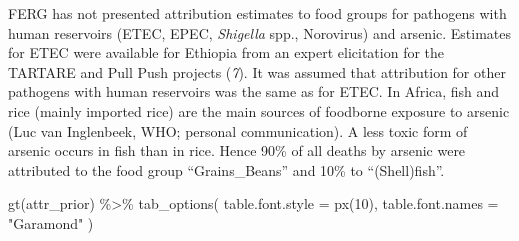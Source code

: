 \documentclass[
  letterpaper,
  DIV=11,
  numbers=noendperiod]{scrartcl}
\newenvironment{Shaded}{\begin{snugshade}}{\end{snugshade}}
\newcommand{\AttributeTok}[1]{\textcolor[rgb]{0.40,0.45,0.13}{#1}}
\newcommand{\DecValTok}[1]{\textcolor[rgb]{0.68,0.00,0.00}{#1}}
\newcommand{\FunctionTok}[1]{\textcolor[rgb]{0.28,0.35,0.67}{#1}}
\newcommand{\NormalTok}[1]{\textcolor[rgb]{0.00,0.23,0.31}{#1}}
\newcommand{\SpecialCharTok}[1]{\textcolor[rgb]{0.37,0.37,0.37}{#1}}
\newcommand{\StringTok}[1]{\textcolor[rgb]{0.13,0.47,0.30}{#1}}
\begin{document}
FERG has not presented attribution estimates to food groups for
pathogens with human reservoirs (ETEC, EPEC, \emph{Shigella} spp.,
Norovirus) and arsenic. Estimates for ETEC were available for Ethiopia
from an expert elicitation for the TARTARE and Pull Push projects
(\emph{7}). It was assumed that attribution for other pathogens with
human reservoirs was the same as for ETEC. In Africa, fish and rice
(mainly imported rice) are the main sources of foodborne exposure to
arsenic (Luc van Inglenbeek, WHO; personal communication). A less toxic
form of arsenic occurs in fish than in rice. Hence 90\% of all deaths by
arsenic were attributed to the food group ``Grains\_Beans'' and 10\% to
``(Shell)fish''.

\begin{Shaded}
\begin{Highlighting}[]
\FunctionTok{gt}\NormalTok{(attr\_prior) }\SpecialCharTok{\%\textgreater{}\%} 
  \FunctionTok{tab\_options}\NormalTok{(}
    \AttributeTok{table.font.style =} \FunctionTok{px}\NormalTok{(}\DecValTok{10}\NormalTok{),}
    \AttributeTok{table.font.names =} \StringTok{"Garamond"}
\NormalTok{  )}
\end{Highlighting}
\end{Shaded}

\begin{table}

\caption{\label{tbl-prior-attr}Prior attribution estimates (percent)}


\end{table}%
\end{document}
